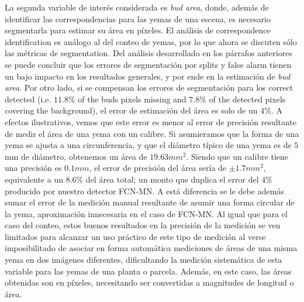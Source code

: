 \documentclass[a4paper,authoryear,review]{elsarticle}
\begin{document}
	
	La segunda variable de interés considerada es \emph{bud area}, donde, además de identificar las correspondencias para las yemas de una escena, es necesario segmentarla para estimar su área en píxeles. El análisis de correspondence identification es análogo al del conteo de yemas, por lo que ahora se discuten sólo las métricas de segmentation. Del análisis desarrollado en los párrafos anteriores se puede concluir que los errores de segmentación por splits y false alarm tienen un bajo impacto en los resultados generales, y por ende en la estimación de \emph{bud area}. Por otro lado, si se compensan los errores de segmentación para los correct detected (i.e. $11.8\%$ of the buds pixels missing and $7.8\%$ of the detected pixels covering the background), el error de estimación del área es solo de un $4\%$. A efectos ilustrativos, vemos que este error es menor al error de precisión resultante de medir el área de una yema con un calibre. Si asumieramos que la forma de una yema se ajusta a una circunferencia, y que el diámetro típico de una yema es de $5$ mm de diámetro, obtenemos un área de $19.63 mm^2$. Siendo que un calibre tiene una precisión es $0.1 mm$, el error de precisión del área sería de $\pm 1.7 mm^2$, equivalente a un $8.6\%$ del área total; un monto que duplica el error del $4\%$ producido por nuestro detector FCN-MN. A está diferencia se le debe además sumar el error de la medición manual resultante de asumir una forma circular de la yema, aproximación innecesaria en el caso de FCN-MN.
	Al igual que para el caso del conteo, estos buenos resultados en la precisión de la medición se ven limitados  para alcanzar un uso práctico de este tipo de medición al verse imposibilitado de asociar en forma automática mediciones de áreas de una misma yema en dos imágenes diferentes, dificultando  la medición sistemática de esta variable para las yemas de una planta o parcela. Además, en este caso, las áreas obtenidas son en píxeles, necesitando ser convertidas a magnitudes de longitud o área.
	
\end{document}
